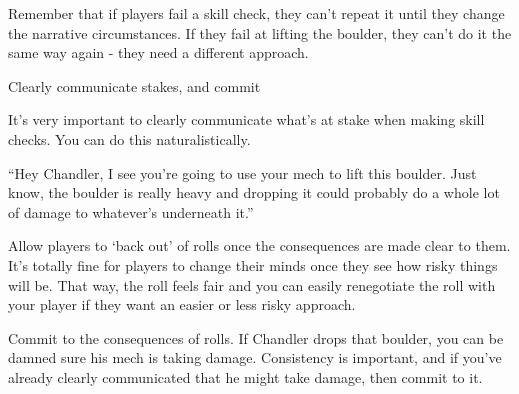 Remember that if players fail a skill check, they can’t repeat it until they change the
narrative circumstances. If they fail at lifting the boulder, they can’t do it the same way again -
they need a different approach.


                              Clearly communicate stakes, and commit


It’s very important to clearly communicate what’s at stake when making skill checks. You can
do this naturalistically.

	        “Hey Chandler, I see you’re going to use your mech to lift this boulder. Just know, the
boulder is really heavy and dropping it could probably do a whole lot of damage to whatever’s
underneath it.”





Allow players to ‘back out’ of rolls once the consequences are made clear to them. It’s totally
fine for players to change their minds once they see how risky things will be. That way, the roll
feels fair and you can easily renegotiate the roll with your player if they want an easier or less
risky approach.


Commit to the consequences of rolls. If Chandler drops that boulder, you can be damned sure
his mech is taking damage. Consistency is important, and if you’ve already clearly
communicated that he might take damage, then commit to it.

